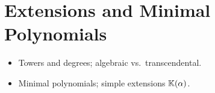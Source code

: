 \section{Extensions and Minimal Polynomials}
\begin{itemize}
  \item Towers and degrees; algebraic vs.\ transcendental.
  \item Minimal polynomials; simple extensions $\mathbb{K}(\alpha)$.
\end{itemize}
